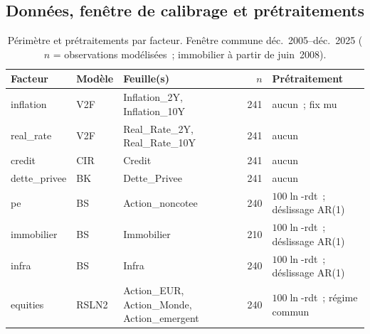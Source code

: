 \documentclass[11pt,a4paper]{article}
\theoremstyle{definition}
\begin{document}
\subsection{Données, fenêtre de calibrage et prétraitements}
\begin{table}[H]\centering\small\renewcommand{\arraystretch}{1.2}\setlength{\tabcolsep}{5pt}
\begin{tabularx}{\textwidth}{@{}l l X r l@{}}
\toprule
\textbf{Facteur} & \textbf{Modèle} & \textbf{Feuille(s)} & \textbf{$n$} & \textbf{Prétraitement}\\
\midrule
inflation & V2F & \footnotesize Inflation\_2Y, Inflation\_10Y & 241 & \footnotesize aucun~; fix mu\\
real\_rate & V2F & \footnotesize Real\_Rate\_2Y, Real\_Rate\_10Y & 241 & \footnotesize aucun\\
credit & CIR & \footnotesize Credit & 241 & \footnotesize aucun\\
dette\_privee & BK & \footnotesize Dette\_Privee & 241 & \footnotesize aucun\\
pe & BS & \footnotesize Action\_noncotee & 240 & \footnotesize $100\ln$-rdt~; déslissage AR(1)\\
immobilier & BS & \footnotesize Immobilier & 210 & \footnotesize $100\ln$-rdt~; déslissage AR(1)\\
infra & BS & \footnotesize Infra & 240 & \footnotesize $100\ln$-rdt~; déslissage AR(1)\\
equities & RSLN2 & \footnotesize Action\_EUR, Action\_Monde, Action\_emergent & 240 & \footnotesize $100\ln$-rdt~; régime commun\\
\bottomrule\end{tabularx}
\caption{Périmètre et prétraitements par facteur. Fenêtre commune déc.~2005--déc.~2025 ($n$ = observations modélisées~; immobilier à partir de juin~2008).}\label{tab:res-data}
\end{table}
\end{document}
